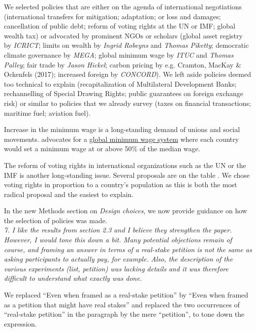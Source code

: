 \documentclass[12pt,english]{article}
\begin{document}
We selected policies that are either on the agenda of international negotiations (international transfers for mitigation; adaptation; or loss and damages; cancellation of public debt; reform of voting rights at the UN or IMF; global wealth tax) or advocated by prominent NGOs or scholars (global asset registry by \textit{ICRICT}; limits on wealth by \textit{Ingrid Robeyns} and \textit{Thomas Piketty}; democratic climate governance by \textit{MEGA}; global minimum wage by \textit{ITUC} and \textit{Thomas Palley}; 
fair trade by \textit{Jason Hickel}; carbon pricing by e.g. Cramton, MacKay \& Ockenfels (2017); increased foreign by \textit{CONCORD}). 
We left aside policies deemed too technical to explain (recapitalization of Multilateral Development Banks; rechannelling of Special Drawing Rights; public guarantees on foreign exchange risk) or similar to policies that we already survey (taxes on financial transactions; maritime fuel; aviation fuel). 

Increase in the minimum wage is a long-standing demand of unions and social movements. \citet{palley_financial_2013} advocates for a \href{https://www.ft.com/content/fa0af8ca-345a-318b-8850-d8d93e61feaa}{global minimum wage system} where each country would set a minimum wage at or above 50\% of the median wage. 

The reform of voting rights in international organizations such as the UN or the IMF is another long-standing issue. Several proposals are on the table \citep{woodward_imf_2007}. We chose voting rights in proportion to a country's population as this is both the most radical proposal and the easiest to explain. 

In the new Methods section on \textit{Design choices}, we now provide guidance on how the selection of policies was made. %
~\\

\textit{7. I like the results from section 2.3 and I believe they strengthen the paper. However, I would tone this down a bit. Many potential objections remain of course, and framing an answer in terms of a real-stake petition is not the same as asking participants to actually pay, for example. Also, the description of the various experiments (list, petition) was lacking details and it was therefore difficult to understand what exactly was done.}

We replaced ``Even when framed as a real-stake petition'' by ``Even when framed as a petition that might have real stakes'' and replaced the two occurrences of ``real-stake petition'' in the paragraph by the mere ``petition'', to tone down the expression. %
~\\
\end{document}
